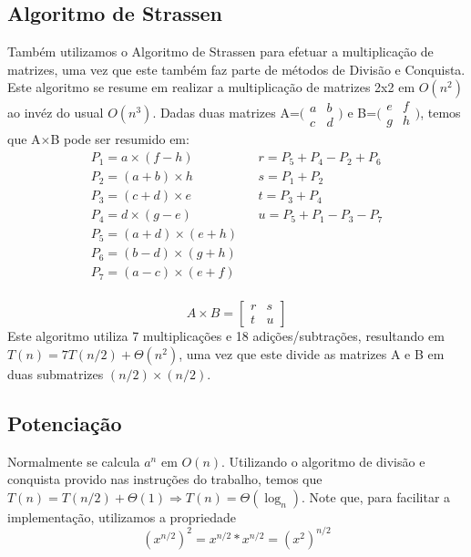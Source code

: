 \documentclass[10pt,a4paper]{article}
\begin{document}
\subsection{Algoritmo de Strassen}
Também utilizamos o Algoritmo de Strassen para efetuar a multiplicação de matrizes, uma vez que este também faz parte de métodos de Divisão e Conquista. Este algoritmo se resume em realizar a multiplicação de matrizes 2x2 em $O(n^2)$ ao invéz do usual $O(n^3)$.
Dadas duas matrizes A=$\bigl(\begin{smallmatrix}
a&b\\ c&d
\end{smallmatrix} \bigr)$ e B=$\bigl(\begin{smallmatrix}
e&f\\ g&h
\end{smallmatrix} \bigr)$, temos que A$\times$B pode ser resumido em:
\begin{equation} \nonumber
\begin{array}{lcl}
P_1 = a\times(f-h) & & r = P_5 + P_4 - P_2 + P_6\\
P_2 = (a+b)\times h & & s = P_1 + P_2\\
P_3 = (c+d)\times e & & t = P_3 + P_4\\
P_4 = d \times (g-e) & & u = P_5 + P_1 - P_3 - P_7\\
P_5 = (a+d) \times (e+h) & & \\
P_6 = (b-d) \times (g+h) & & \\
P_7 = (a-c) \times (e+f) & & \\
\end{array}
\end{equation}

\begin{equation}\nonumber
A \times B = 
\begin{bmatrix}
r&s\\t&u
\end{bmatrix}
\end{equation}
Este algoritmo utiliza 7 multiplicações e 18 adições/subtrações, resultando em $T(n) = 7T(n/2)+\Theta(n^2)$, uma vez que este divide as matrizes A e B em duas submatrizes $(n/2) \times (n/2)$.
\subsection{Potenciação}
Normalmente se calcula $a^n$ em $O(n)$. Utilizando o algoritmo de divisão e conquista provido nas instruções do trabalho, temos que $T(n)=T(n/2) + \Theta (1) \Rightarrow T(n) = \Theta (\log_n)$.
Note que, para facilitar a implementação, utilizamos a propriedade
\begin{equation}
(x^{n/2})^2 = x^{n/2}*x^{n/2} = (x^2)^{n/2}
\end{equation}
\end{document}
